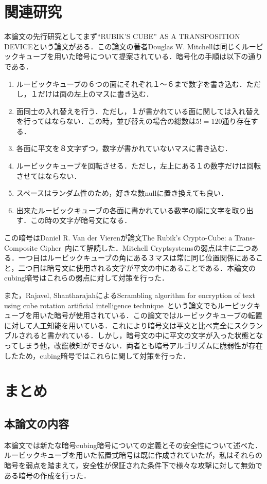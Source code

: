 \documentclass[a4j,titlepage]{jsarticle}
\begin{document}
\section{関連研究}
本論文の先行研究としてまず``RUBIK'S CUBE'' AS A TRANSPOSITION DEVICE\cite{Mitchell}という論文がある．この論文の著者Douglas W. Mitchellは同じくルービックキューブを用いた暗号について提案されている．暗号化の手順は以下の通りである．
\begin{enumerate}
  \item ルービックキューブの６つの面にそれぞれ１〜６まで数字を書き込む．ただし，１だけは面の左上のマスに書き込む．
  \item 面同士の入れ替えを行う．ただし，１が書かれている面に関しては入れ替えを行ってはならない．この時，並び替えの場合の総数は\(5!=120\)通り存在する．
  \item 各面に平文を８文字ずつ，数字が書かれていないマスに書き込む．
  \item ルービックキューブを回転させる．ただし，左上にある１の数字だけは回転させてはならない．
  \item スペースはランダム性のため，好きな数nullに置き換えても良い．
  \item 出来たルービックキューブの各面に書かれている数字の順に文字を取り出す．この時の文字が暗号文になる．
\end{enumerate}
この暗号はDaniel R. Van der Vierenが論文The Rubik's Crypto-Cube: a Trans-Composite Cipher~\cite{Trans-Composite Cipher}内にて解読した．Mitchell Cryptsystemsの弱点は主に二つある．一つ目はルービックキューブの角にある３マスは常に同じ位置関係にあること，二つ目は暗号文に使用される文字が平文の中にあることである．本論文のcubing暗号はこれらの弱点に対して対策を行った．

また，Rajavel, ShantharajahによるScrambling algorithm for encryption of text using cube rotation artificial intelligence technique~\cite{Scrambling algorithm}という論文でもルービックキューブを用いた暗号が使用されている．この論文ではルービックキューブの転置に対して人工知能を用いている．これにより暗号文は平文と比べ完全にスクランブルされると書かれている．しかし，暗号文の中に平文の文字が入った状態となってしまう他，改竄検知ができない．両者とも暗号アルゴリズムに脆弱性が存在したため，cubing暗号ではこれらに関して対策を行った．

\section{まとめ}

\subsection{本論文の内容}
本論文では新たな暗号cubing暗号についての定義とその安全性について述べた．ルービックキューブを用いた転置式暗号は既に作成されていたが，私はそれらの暗号を弱点を踏まえて，安全性が保証された条件下で様々な攻撃に対して無効である暗号の作成を行った．
\end{document}
